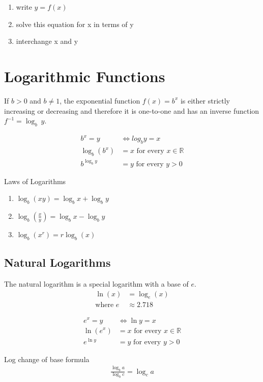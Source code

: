 \documentclass{article}
\theoremstyle{mytheoremstyle}
\theoremstyle{mytheoremstyle}
\theoremstyle{myproblemstyle}
\begin{document}
    \begin{enumerate}
        \item write $y=f(x)$
        \item solve this equation for x in terms of y
        \item interchange x and y
    \end{enumerate}

    \section*{Logarithmic Functions}

    If $b>0$ and $b\ne 1$, the exponential function $f(x)=b^x$ is either
    strictly increasing or decreasing and therefore it is one-to-one and has an
    inverse function $f^{-1} = \log_{b}\ y$.

    \begin{align*}
        b^x=y &\Leftrightarrow log_by=x \\
        \log_b(b^x)&=x \text{ for every } x \in \mathbb{R} \\
        b^{\log_by}&=y \text{ for every } y > 0
    \end{align*}

    Laws of Logarithms
    \begin{enumerate}
        \item $\log_b(xy)=\log_bx+\log_by$

        \item $\log_b(\frac{x}{y})=\log_bx-\log_by$

        \item $\log_b(x^r)=r\log_b(x)$
    \end{enumerate}

    \subsection*{Natural Logarithms}
    The natural logarithm is a special logarithm with a base of $e$.
    \begin{align*}
        \ln(x)&=\log_e(x) \\
        \text{where } e &\approx 2.718
    \end{align*}

    \begin{align*}
        e^x=y &\Leftrightarrow \ln y=x \\
        \ln(e^x)&=x \text{ for every } x \in \mathbb{R} \\
        e^{\ln y}&=y \text{ for every } y > 0
    \end{align*}

    Log change of base formula
    \begin{align*}
        \frac{\log_b a}{\log_b c} = \log_c a
    \end{align*}
\end{document}

